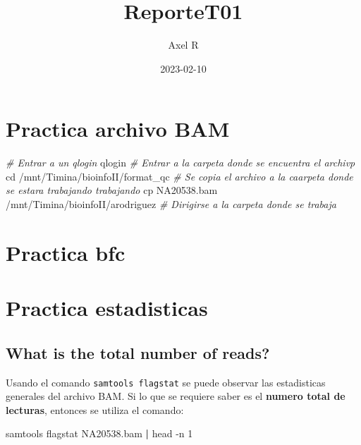 \documentclass[
]{article}
\title{ReporteT01}
\author{Axel R}
\date{2023-02-10}
\newenvironment{Shaded}{\begin{snugshade}}{\end{snugshade}}
\newcommand{\AttributeTok}[1]{\textcolor[rgb]{0.77,0.63,0.00}{#1}}
\newcommand{\BuiltInTok}[1]{#1}
\newcommand{\CommentTok}[1]{\textcolor[rgb]{0.56,0.35,0.01}{\textit{#1}}}
\newcommand{\ExtensionTok}[1]{#1}
\newcommand{\FunctionTok}[1]{\textcolor[rgb]{0.00,0.00,0.00}{#1}}
\newcommand{\KeywordTok}[1]{\textcolor[rgb]{0.13,0.29,0.53}{\textbf{#1}}}
\newcommand{\NormalTok}[1]{#1}
\begin{document}
\maketitle

\hypertarget{practica-archivo-bam}{%
\section{Practica archivo BAM}\label{practica-archivo-bam}}

\begin{Shaded}
\begin{Highlighting}[]
\CommentTok{\# Entrar a un qlogin}
\ExtensionTok{qlogin}
\CommentTok{\# Entrar a la carpeta donde se encuentra el archivp}
\BuiltInTok{cd}\NormalTok{ /mnt/Timina/bioinfoII/format\_qc}
\CommentTok{\# Se copia el archivo a la caarpeta donde se estara trabajando trabajando}
\FunctionTok{cp}\NormalTok{ NA20538.bam /mnt/Timina/bioinfoII/arodriguez}
\CommentTok{\# Dirigirse a la carpeta donde se trabaja}
\end{Highlighting}
\end{Shaded}

\hypertarget{practica-bfc}{%
\section{Practica bfc}\label{practica-bfc}}

\hypertarget{practica-estadisticas}{%
\section{Practica estadisticas}\label{practica-estadisticas}}

\hypertarget{what-is-the-total-number-of-reads}{%
\subsection{What is the total number of
reads?}\label{what-is-the-total-number-of-reads}}

Usando el comando \texttt{samtools\ flagstat} se puede observar las
estadisticas generales del archivo BAM. Si lo que se requiere saber es
el \textbf{numero total de lecturas}, entonces se utiliza el comando:

\begin{Shaded}
\begin{Highlighting}[]
\ExtensionTok{samtools}\NormalTok{ flagstat NA20538.bam }\KeywordTok{|} \FunctionTok{head} \AttributeTok{{-}n}\NormalTok{ 1}
\end{Highlighting}
\end{Shaded}
\end{document}
